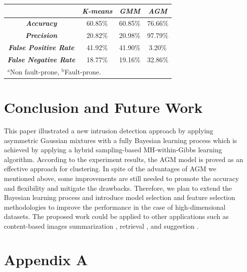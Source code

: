\documentclass[conference]{llncs}
\begin{document}
\begin{table}
\begin{center}
\begin{tabular}{|c|c|c|c|}
\hline
& \multicolumn{1}{|p{2.5cm}|}{\centering \textbf{\textit{K-means}}} & \multicolumn{1}{|p{2.5cm}|}{\centering \textbf{\textit{GMM}}} & \multicolumn{1}{|p{2.5cm}|}{\centering \textbf{\textit{AGM}}}\\
\hline
\multicolumn{1}{|p{3.5cm}|}{\centering \textbf{\textit{Accuracy}}} & 60.85\% & 60.85\% & 76.66\%\\
\multicolumn{1}{|p{3.5cm}|}{\centering \textbf{\textit{Precision}}} & 20.82\% & 20.98\% & 97.79\%\\
\multicolumn{1}{|p{3.5cm}|}{\centering \textbf{\textit{False Positive Rate}}} & 41.92\% & 41.90\% & 3.20\%\\
\multicolumn{1}{|p{3.5cm}|}{\centering \textbf{\textit{False Negative Rate}}} & 18.77\% & 19.16\% & 32.86\%\\
\hline
\multicolumn{3}{l}{$^{\mathrm{a}}$Non fault-prone, $^{\mathrm{b}}$Fault-prone.}
\end{tabular}
\end{center}
\label{tab4}
\end{table}

\section{Conclusion and Future Work}
This paper illustrated a new intrusion detection approach by applying asymmetric Gaussian mixtures with a fully Bayesian learning process which is achieved by applying a hybrid sampling-based MH-within-Gibbs learning algorithm. According to the experiment results, the AGM model is proved as an effective approach for clustering.
In spite of the advantages of AGM we mentioned above, some improvements are still needed to promote the accuracy and flexibility and mitigate the drawbacks. Therefore, we plan to extend the Bayesian learning process and introduce model selection and feature selection methodologies to improve the performance in the case of high-dimensional datasets. The proposed work could be applied to other applications such as content-based images summarization \cite{Bouguila2007a}, retrieval \cite{Bouguila2004b}, and suggestion \cite{Boutemedjet2007}.

\section*{Appendix A}
\end{document}
